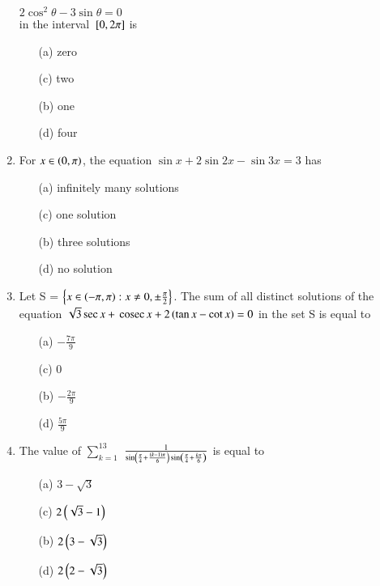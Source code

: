 \documentclass[journal,12pt,twocolumn,article]{IEEEtran}
\theoremstyle{remark}
\begin{document}
\begin{enumerate}[start = 20]
$2\cos^2\theta - 3\sin\theta = 0$\\
in the interval ${}\left[0,2\pi\right]$ is
\hfill{}
\begin{multicols}{2}
\begin{enumerate}
\item[(a)] zero
\item[(c)] two
\columnbreak
\item[(b)] one
\item[(d)] four
\end{enumerate}
\end{multicols}
\item For $x \in \left(0,\pi\right)$, the equation $\sin x + 2\sin 2x - \sin 3x = 3$ has
\hfill{}
\begin{multicols}{2}
\begin{enumerate}
\item[(a)] infinitely many solutions
\item[(c)] one solution
\columnbreak
\item[(b)] three solutions
\item[(d)] no solution
\end{enumerate}
\end{multicols}
\item Let S = $\left\{x \in \left(-\pi,\pi\right) : x \neq 0, \pm \frac{\pi}{2}\right\}$. The sum of all distinct solutions of the equation $\sqrt{3} \sec x + \,\text{cosec}\, x + 2\left(\tan x - \cot x\right) = 0$ in the set S is equal to
\hfill{}
\begin{multicols}{2}
\begin{enumerate}
\item[(a)] $-\frac{7\pi}{9}$
\item[(c)] 0
\columnbreak
\item[(b)] $-\frac{2\pi}{9}$
\item[(d)] $\frac{5\pi}{9}$
\end{enumerate}
\end{multicols}
\item The value of $\sum_{k=1}^{13}$ $\frac{1}{\sin\left(\frac{\pi}{4} + \frac{\left(k-1\right)\pi}{6}\right)\sin\left(\frac{\pi}{4} + \frac{k\pi}{6}\right)}$ is equal to
\hfill{}
\begin{multicols}{2}
\begin{enumerate}
\item[(a)] $3-\sqrt{3}$
\item[(c)] $2\left(\sqrt{3}-1\right)$
\columnbreak
\item[(b)] $2\left(3-\sqrt{3}\right)$
\item[(d)] $2\left(2-\sqrt{3}\right)$
\end{enumerate}
\end{multicols}
\end{enumerate}
\end{document}

